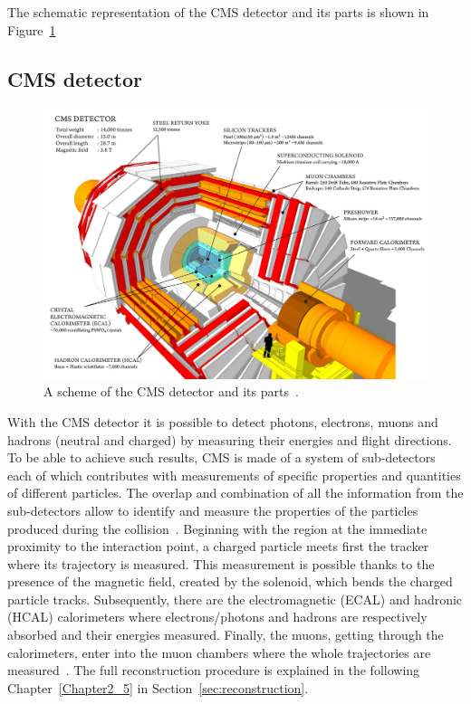 The schematic representation of the CMS detector and its parts is
shown in Figure~\ref{fig:detector}


\subsection{CMS detector}\label{sec:cmsdetector}
\begin{figure}[h]
\centering
\includegraphics[width=1\textwidth]{Figures/c2/cms_160312_06-compressed.pdf}
\vspace*{3mm}
\caption{A scheme of the CMS detector and its parts~\cite{webpage_cms}.}
\label{fig:detector}
\end{figure} 
With the CMS detector it is possible to detect photons, electrons, muons
and hadrons (neutral and charged) by measuring their energies and flight
directions. 
To be able to achieve such results, CMS is made of a system of sub-detectors each of which contributes with
measurements of specific properties and quantities of different 
particles. The overlap and combination of all the
information from the sub-detectors allow to identify and measure the
properties of the particles produced during the collision~\cite{CMS:particleflow}. Beginning
with the region at the immediate proximity to the interaction point, a
charged particle meets first the tracker where its trajectory is
measured. This measurement is possible thanks to the presence of the
magnetic field, created by the solenoid, which bends the charged
particle tracks. Subsequently, there are the
electromagnetic (ECAL) and hadronic (HCAL) calorimeters where
electrons/photons and hadrons are respectively absorbed and their
energies measured. Finally, the muons, getting through the
calorimeters, enter into the muon chambers where the whole trajectories
are measured~\cite{CMS:particleflow}. The full reconstruction
procedure is explained in the following Chapter~\ref{Chapter2_5} in Section~\ref{sec:reconstruction}.\\

